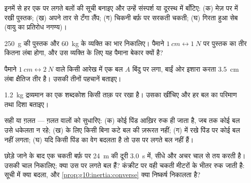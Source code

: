 \begin{exercise}[$\star$]\label{exo:g10:inertia:1}
इनमें से हर एक पर लगते बलों की सूची बनाइए और उन्हें संस्पर्श या दूरस्थ में
बाँटिए: (क) मेज़ पर  में रखी पुस्तक; (ख) अपने तार से टँगा लैंप; (ग)
चिकनी बर्फ़ पर सरकती चकती; (घ) गिरता हुआ सेब (वायु का प्रतिरोध नगण्य)।
\end{exercise}

\begin{exercise}[$\star$]\label{exo:g10:inertia:2}
\qty{250}{g} की पुस्तक और \qty{60}{kg} के व्यक्ति का भार निकालिए। पैमाने
$\qty{1}{cm} \leftrightarrow \qty{1}{N}$ पर पुस्तक का तीर कितना लंबा होगा, और उस व्यक्ति के लिए यह पैमाना
बेकार क्यों है?
\end{exercise}

\begin{exercise}[$\star$]\label{exo:g10:inertia:3}
पैमाने $\qty{1}{cm} \leftrightarrow \qty{2}{N}$ वाले किसी आरेख में एक बल $A$ बिंदु पर लगा,
बाईं ओर इशारा करता \qty{3.5}{cm} लंबा क्षैतिज तीर है। उसकी तीनों पहचानें
बताइए।
\end{exercise}

\begin{exercise}[$\star$]\label{exo:g10:inertia:4}
\qty{1.2}{kg} द्रव्यमान का एक शब्दकोश किसी ताक़ पर रखा है। उसका  खींचिए और हर बल का परिमाण तथा दिशा बताइए।
\end{exercise}

\begin{exercise}[$\star$]\label{exo:g10:inertia:5}
सही या ग़लत --- ग़लत वालों को सुधारिए: (क) कोई पिंड आख़िर रुक ही जाता है,
जब तक कोई बल उसे धकेलता न रहे; (ख)  के लिए किसी बिना कटे बल की ज़रूरत नहीं; (ग)  में रखे
पिंड पर कोई बल नहीं लगता; (घ) यदि किसी पिंड का वेग बदलता है तो
उस पर लगते बल  नहीं हैं।
\end{exercise}

\begin{exercise}[$\star\star$]\label{exo:g10:inertia:6}
छोड़े जाने के बाद एक चकती बर्फ़ पर \qty{24}{m} की दूरी \qty{3.0}{s} में, सीधे और
अचर चाल से तय करती है। उसकी चाल निकालिए; क्या उस पर लगते बल
 हैं? कंक्रीट पर वही चकती मीटरों के भीतर रुक
जाती है: सूची में क्या बदला, और \cref{prop:g10:inertia:converse} क्या निष्कर्ष निकालता है?
\end{exercise}

